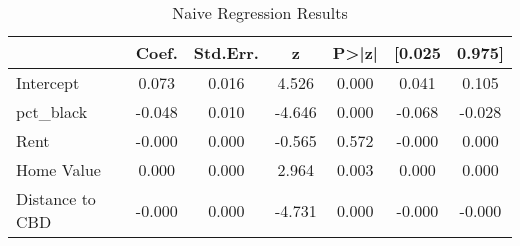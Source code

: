 \begin{table}[h]
\centering
\caption{Naive Regression Results}
\label{tab:naive_results}
\begin{tabular}{lcccccc}
\toprule
 & Coef. & Std.Err. & z & P>|z| & [0.025 & 0.975] \\
\midrule
Intercept & 0.073 & 0.016 & 4.526 & 0.000 & 0.041 & 0.105 \\
pct_black & -0.048 & 0.010 & -4.646 & 0.000 & -0.068 & -0.028 \\
Rent & -0.000 & 0.000 & -0.565 & 0.572 & -0.000 & 0.000 \\
Home Value & 0.000 & 0.000 & 2.964 & 0.003 & 0.000 & 0.000 \\
Distance to CBD & -0.000 & 0.000 & -4.731 & 0.000 & -0.000 & -0.000 \\
\bottomrule
\end{tabular}
\end{table}
